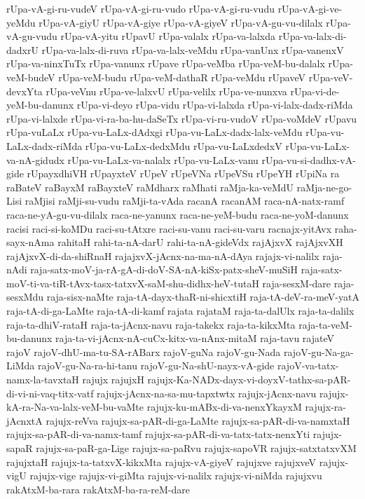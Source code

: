 {rUpa-vA-gi-ru-vudeV
rUpa-vA-gi-ru-vudo
rUpa-vA-gi-ru-vudu
rUpa-vA-gi-ve-yeMdu
rUpa-vA-giyU
rUpa-vA-giye
rUpa-vA-giyeV
rUpa-vA-gu-vu-dilalx
rUpa-vA-gu-vudu
rUpa-vA-yitu
rUpavU
rUpa-valalx
rUpa-va-lalxda
rUpa-va-lalx-di-dadxrU
rUpa-va-lalx-di-ruva
rUpa-va-lalx-veMdu
rUpa-vanUnx
rUpa-vanenxV
rUpa-va-ninxTuTx
rUpa-vanunx
rUpave
rUpa-veMba
rUpa-veM-bu-dalalx
rUpa-veM-budeV
rUpa-veM-budu
rUpa-veM-dathaR
rUpa-veMdu
rUpaveV
rUpa-veV-devxYta
rUpa-veVnu
rUpa-ve-lalxvU
rUpa-velilx
rUpa-ve-nunxva
rUpa-vi-de-yeM-bu-danunx
rUpa-vi-deyo
rUpa-vidu
rUpa-vi-lalxda
rUpa-vi-lalx-dadx-riMda
rUpa-vi-lalxde
rUpa-vi-ra-ba-hu-daSeTx
rUpa-vi-ru-vudoV
rUpa-voMdeV
rUpavu
rUpa-vuLaLx
rUpa-vu-LaLx-dAdxgi
rUpa-vu-LaLx-dadx-lalx-veMdu
rUpa-vu-LaLx-dadx-riMda
rUpa-vu-LaLx-dedxMdu
rUpa-vu-LaLxdedxV
rUpa-vu-LaLx-va-nA-gidudx
rUpa-vu-LaLx-va-nalalx
rUpa-vu-LaLx-vanu
rUpa-vu-si-dadhx-vA-gide
rUpayxdhiVH
rUpayxteV
rUpeV
rUpeVNa
rUpeVSu
rUpeYH
rUpiNa
ra
raBateV
raBayxM
raBayxteV
raMdharx
raMhati
raMja-ka-veMdU
raMja-ne-go-Lisi
raMjisi
raMji-su-vudu
raMji-ta-vAda
racanA
racanAM
raca-nA-natx-ramf
raca-ne-yA-gu-vu-dilalx
raca-ne-yanunx
raca-ne-yeM-budu
raca-ne-yoM-danunx
racisi
raci-si-koMDu
raci-su-tAtxre
raci-su-vanu
raci-su-varu
racnajx-yitAvx
raha-sayx-nAma
rahitaH
rahi-ta-nA-darU
rahi-ta-nA-gideVdx
rajAjxvX
rajAjxvXH
rajAjxvX-di-da-shiRnaH
rajajxvX-jAcnx-na-ma-nA-dAya
rajajx-vi-nalilx
raja-nAdi
raja-satx-moV-ja-rA-gA-di-doV-SA-nA-kiSx-patx-sheV-muSiH
raja-satx-moV-ti-va-tiR-tAvx-tasx-tatxvX-saM-shu-didhx-heV-tutaH
raja-sesxM-dare
raja-sesxMdu
raja-sisx-naMte
raja-tA-dayx-thaR-ni-shicxtiH
raja-tA-deV-ra-meV-yatA
raja-tA-di-ga-LaMte
raja-tA-di-kamf
rajata
rajataM
raja-ta-dalUlx
raja-ta-dalilx
raja-ta-dhiV-rataH
raja-ta-jAcnx-navu
raja-takekx
raja-ta-kikxMta
raja-ta-veM-bu-danunx
raja-ta-vi-jAcnx-nA-cuCx-kitx-va-nAnx-mitaM
raja-tavu
rajateV
rajoV
rajoV-dhU-ma-tu-SA-rABarx
rajoV-guNa
rajoV-gu-Nada
rajoV-gu-Na-ga-LiMda
rajoV-gu-Na-ra-hi-tanu
rajoV-gu-Na-shU-nayx-vA-gide
rajoV-va-tatx-namx-la-tavxtaH
rajujx
rajujxH
rajujx-Ka-NADx-dayx-vi-doyxV-tathx-sa-pAR-di-vi-ni-vaq-titx-vatf
rajujx-jAcnx-na-sa-mu-tapxtwtx
rajujx-jAcnx-navu
rajujx-kA-ra-Na-va-lalx-veM-bu-vaMte
rajujx-ku-mABx-di-va-nenxYkayxM
rajujx-ra-jAcnxtA
rajujx-reVva
rajujx-sa-pAR-di-ga-LaMte
rajujx-sa-pAR-di-va-namxtaH
rajujx-sa-pAR-di-va-namx-tamf
rajujx-sa-pAR-di-va-tatx-tatx-nenxYti
rajujx-sapaR
rajujx-sa-paR-ga-Lige
rajujx-sa-paRvu
rajujx-sapoVR
rajujx-satxtatxvXM
rajujxtaH
rajujx-ta-tatxvX-kikxMta
rajujx-vA-giyeV
rajujxve
rajujxveV
rajujx-vigU
rajujx-vige
rajujx-vi-giMta
rajujx-vi-nalilx
rajujx-vi-niMda
rajujxvu
rakAtxM-ba-rara
rakAtxM-ba-ra-reM-dare
}
